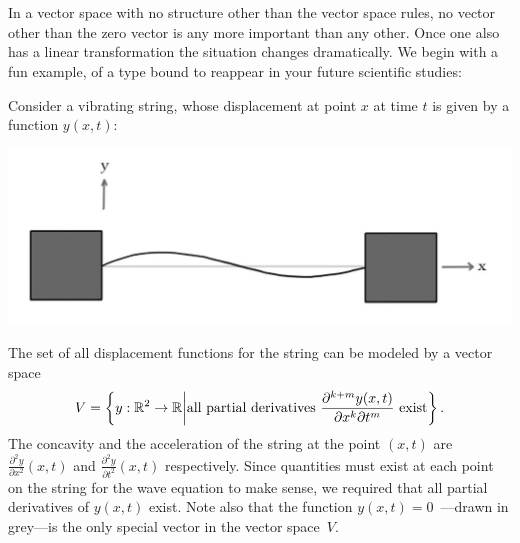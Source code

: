 

\chapter{\eigenTitle}
\label{eigenvalseigenvects}

In a vector space with no structure other than the vector space rules, no vector other than the zero vector  is any  more important than any other.
Once one also has a linear transformation the situation changes dramatically. We begin with a fun example, of a type bound to reappear in your future scientific studies:

\begin{example}

Consider a vibrating string, 
whose displacement at point $x$ at time $t$ is given by a function $y(x,t)$:
\begin{center}
\includegraphics[scale=.3]{string.jpg}
\end{center}
The set of all displacement functions for the string 
can be modeled by 
a vector space 
\[V=\left\{ y:\mathbb{R}^2 \to \mathbb{R} \middle| \mbox{\rm all partial derivatives } \frac{\partial^{k+m}y(x,t)}{\partial x^k\partial t^m} \mbox{ exist}\right\}.\] 
 The concavity and 
 the acceleration of the string at the point $(x,t)$ are 
 $\frac{\partial^2y}{\partial x^2}(x,t)$ and $\frac{\partial^2y}{\partial t^2}(x,t)$ respectively. 
 Since quantities must exist at each point on the string for the wave equation to make sense, 
 we required that all partial derivatives of $y(x,t)$ exist.
 Note also that the function $y(x,t)=0$~---drawn in grey---is the only special vector in the vector space~$V$. 


\end{example}
